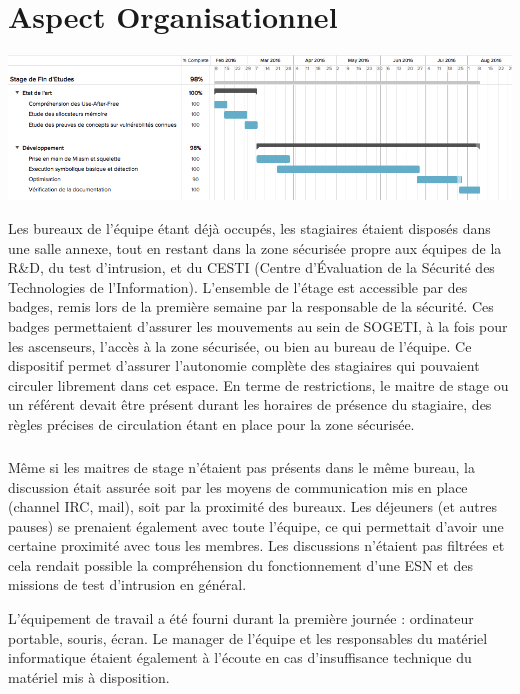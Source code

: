 \section*{Aspect Organisationnel}
\begin{center}
\includegraphics[scale=0.5]{images/gant.png}\newline
\end{center}

Les bureaux de l'équipe étant déjà occupés, les stagiaires étaient disposés dans une salle annexe, tout en restant dans la zone sécurisée propre aux équipes de
la R\&D, du test d'intrusion, et du CESTI (Centre d'Évaluation de la Sécurité des Technologies de l'Information). L'ensemble de l'étage est accessible par des badges, remis lors de la première semaine par la responsable de la
sécurité. Ces badges permettaient d'assurer les mouvements au sein de SOGETI, à la fois pour les ascenseurs, l'accès à la zone sécurisée, ou bien au bureau
de l'équipe. Ce dispositif permet d'assurer l'autonomie complète des stagiaires qui pouvaient circuler librement dans cet espace. En terme de restrictions,
le maitre de stage ou un référent devait être présent durant les horaires de présence du stagiaire, des règles précises de circulation étant en place pour la zone sécurisée.

\subparagraph{}
Même si les maitres de stage n'étaient pas présents dans le même bureau, la discussion était assurée soit par les moyens de communication mis en
place (channel IRC, mail), soit par la proximité des bureaux. Les déjeuners (et autres pauses) se prenaient également avec toute l'équipe, ce qui permettait
d'avoir une certaine proximité avec tous les membres. Les discussions n'étaient pas filtrées et cela rendait possible la compréhension du fonctionnement d'une
ESN et des missions de test d'intrusion en général.

L'équipement de travail a été fourni durant la première journée : ordinateur portable, souris, écran. Le manager de l'équipe et les responsables du matériel
informatique étaient également à l'écoute en cas d'insuffisance technique du matériel mis à disposition.


